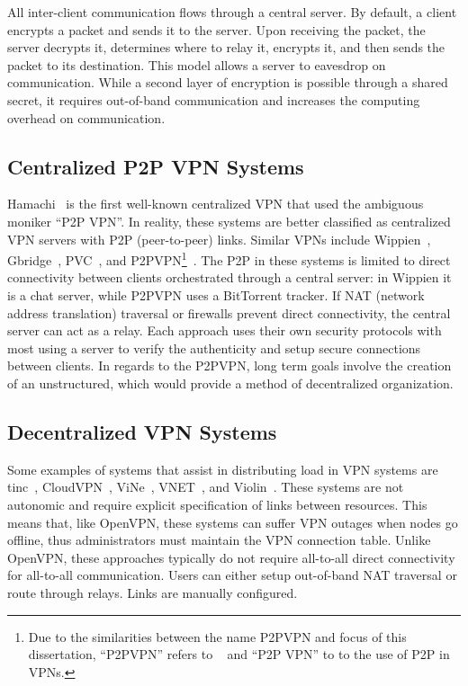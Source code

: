 All inter-client communication flows through a central server.  By default, a
client encrypts a packet and sends it to the server.  Upon receiving the
packet, the server decrypts it, determines where to relay it, encrypts it, and
then sends the packet to its destination.  This model allows a server to
eavesdrop on communication.  While a second layer of encryption is possible
through a shared secret, it requires out-of-band communication and increases
the computing overhead on communication.


\subsection{Centralized P2P VPN Systems}

Hamachi~\cite{hamachi} is the first well-known centralized VPN that used the
ambiguous moniker ``P2P VPN''.  In reality, these systems are better classified
as centralized VPN servers with P2P (peer-to-peer) links.  Similar VPNs include
Wippien~\cite{wippien}, Gbridge~\cite{gbridge}, PVC~\cite{pvc}, and
P2PVPN\footnote{Due to the similarities between the name P2PVPN and focus of
this dissertation, ``P2PVPN'' refers to ~\cite{p2pvpn} and ``P2P VPN'' to to
the use of P2P in VPNs.}~\cite{p2pvpn}.  The P2P in these systems is limited to
direct connectivity between clients orchestrated through a central server: in
Wippien it is a chat server, while P2PVPN uses a BitTorrent tracker.  If NAT
(network address translation) traversal or firewalls prevent direct
connectivity, the central server can act as a relay.  Each approach uses their
own security protocols with most using a server to verify the authenticity and
setup secure connections between clients.  In regards to the P2PVPN, long term
goals involve the creation of an unstructured, which would provide a method of
decentralized organization.

\subsection{Decentralized VPN Systems}
Some examples of systems that assist in distributing load in VPN systems are
tinc~\cite{tinc}, CloudVPN~\cite{cloudvpn}, ViNe~\cite{vine}, VNET~\cite{vnet},
and Violin~\cite{violin}.  These systems are not autonomic and require explicit
specification of links between resources.  This means that, like OpenVPN, these
systems can suffer VPN outages when nodes go offline, thus administrators must
maintain the VPN connection table.  Unlike OpenVPN, these approaches typically
do not require all-to-all direct connectivity for all-to-all communication.
Users can either setup out-of-band NAT traversal or route through relays.  Links
are manually configured.

